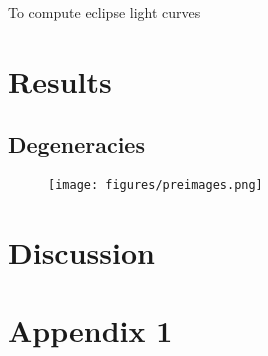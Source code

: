 \documentclass[modern]{aastex631}
\begin{document}
To compute eclipse light curves 
\section{Results}
\label{sec:results}

\subsection{Degeneracies}
\label{ssec:degeneracies}


\begin{figure}[t!]
    \begin{centering}
    \texttt{[image: figures/preimages.png]}
    \caption{}{%
       \label{fig:preimages}
    }
    \end{centering}
\end{figure}





\section{Discussion}
\label{sec:discussion}





\appendix
\section{Appendix 1}
\clearpage
\end{document}
